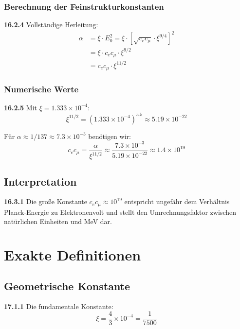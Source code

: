 \documentclass[12pt,a4paper]{article}
\newcommand{\xipar}{\xi}
\begin{document}
\subsubsection{Berechnung der Feinstrukturkonstanten}
\noindent \textbf{16.2.4} Vollständige Herleitung:
\begin{align}
	\alpha &= \xipar \cdot E_0^2 = \xipar \cdot \left[ \sqrt{c_e c_\mu} \cdot \xipar^{9/4} \right]^2 \\
	&= \xipar \cdot c_e c_\mu \cdot \xipar^{9/2} \\
	&= c_e c_\mu \cdot \xipar^{11/2}
\end{align}

\subsubsection{Numerische Werte}
\noindent \textbf{16.2.5} Mit $\xipar = 1.333 \times 10^{-4}$:
\begin{equation}
	\xipar^{11/2} = (1.333 \times 10^{-4})^{5.5} \approx 5.19 \times 10^{-22}
\end{equation}

Für $\alpha \approx 1/137 \approx 7.3 \times 10^{-3}$ benötigen wir:
\begin{equation}
	c_e c_\mu = \frac{\alpha}{\xipar^{11/2}} \approx \frac{7.3 \times 10^{-3}}{5.19 \times 10^{-22}} \approx 1.4 \times 10^{19}
\end{equation}

\subsection{Interpretation}
\noindent \textbf{16.3.1} Die große Konstante $c_e c_\mu \approx 10^{19}$ entspricht ungefähr dem Verhältnis Planck-Energie zu Elektronenvolt und stellt den Umrechnungsfaktor zwischen natürlichen Einheiten und MeV dar.

\section{Exakte Definitionen}

\subsection{Geometrische Konstante}
\noindent \textbf{17.1.1} Die fundamentale Konstante:
\begin{equation}
	\xi = \frac{4}{3} \times 10^{-4} = \frac{1}{7500}
\end{equation}
\end{document}
